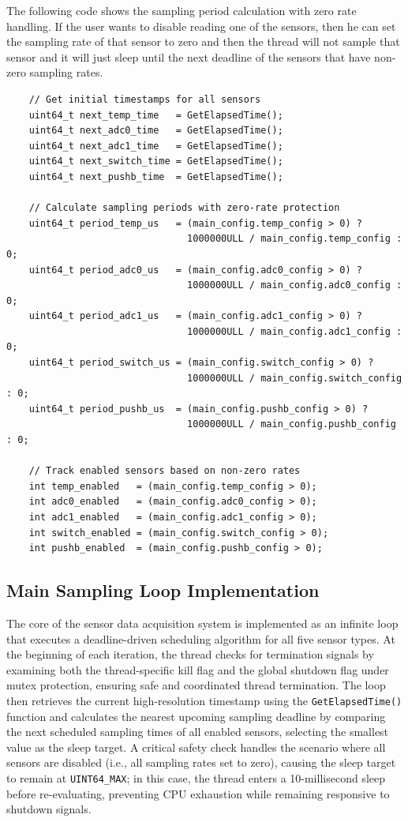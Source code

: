 The following code shows the sampling period calculation with zero rate handling. If the user wants to disable reading one of the sensors, then he can set the sampling rate of that sensor to zero and then the thread will not sample that sensor and it will just sleep until the next deadline of the sensors that have non-zero sampling rates. 
\begin{verbatim}
	// Get initial timestamps for all sensors
	uint64_t next_temp_time   = GetElapsedTime();
	uint64_t next_adc0_time   = GetElapsedTime();
	uint64_t next_adc1_time   = GetElapsedTime();
	uint64_t next_switch_time = GetElapsedTime();
	uint64_t next_pushb_time  = GetElapsedTime();

	// Calculate sampling periods with zero-rate protection
	uint64_t period_temp_us   = (main_config.temp_config > 0) ? 
								1000000ULL / main_config.temp_config : 0;
	uint64_t period_adc0_us   = (main_config.adc0_config > 0) ? 
								1000000ULL / main_config.adc0_config : 0;
	uint64_t period_adc1_us   = (main_config.adc1_config > 0) ? 
								1000000ULL / main_config.adc1_config : 0;
	uint64_t period_switch_us = (main_config.switch_config > 0) ? 
								1000000ULL / main_config.switch_config : 0;
	uint64_t period_pushb_us  = (main_config.pushb_config > 0) ? 
								1000000ULL / main_config.pushb_config : 0;

	// Track enabled sensors based on non-zero rates
	int temp_enabled   = (main_config.temp_config > 0);
	int adc0_enabled   = (main_config.adc0_config > 0);
	int adc1_enabled   = (main_config.adc1_config > 0);
	int switch_enabled = (main_config.switch_config > 0);
	int pushb_enabled  = (main_config.pushb_config > 0);
\end{verbatim}

\subsection{Main Sampling Loop Implementation}

The core of the sensor data acquisition system is implemented as an infinite loop that executes a deadline-driven scheduling algorithm for all five sensor types. At the beginning of each iteration, the thread checks for termination signals by examining both the thread-specific kill flag and the global shutdown flag under mutex protection, ensuring safe and coordinated thread termination. The loop then retrieves the current high-resolution timestamp using the \texttt{GetElapsedTime()} function and calculates the nearest upcoming sampling deadline by comparing the next scheduled sampling times of all enabled sensors, selecting the smallest value as the sleep target. A critical safety check handles the scenario where all sensors are disabled (i.e., all sampling rates set to zero), causing the sleep target to remain at \texttt{UINT64\_MAX}; in this case, the thread enters a 10-millisecond sleep before re-evaluating, preventing CPU exhaustion while remaining responsive to shutdown signals. 

